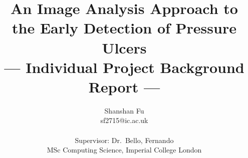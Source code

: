 \title{An Image Analysis Approach to the Early Detection of Pressure Ulcers\\\Large{--- Individual Project Background Report ---}}
\author{Shanshan Fu \\
       sf2715@ic.ac.uk\\ \\
       \small{Supervisor: Dr.\ Bello, Fernando}\\
       \small{MSc Computing Science, Imperial College London}
}